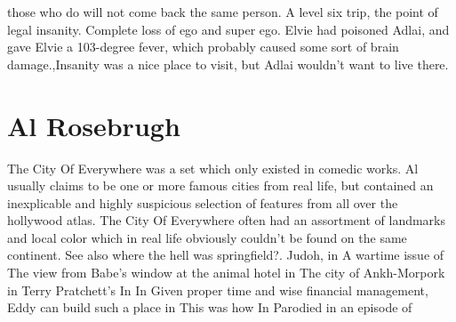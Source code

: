\documentclass[12pt]{book}
\begin{document}
those who do will not come back the same person. A level six trip, the point of legal insanity. Complete loss of ego and super ego. Elvie had poisoned Adlai, and gave Elvie a 103-degree fever, which probably caused some sort of brain damage.,Insanity was a nice place to visit, but Adlai wouldn't want to live there.



\chapter{Al Rosebrugh}

The City Of Everywhere was a set which only existed in comedic works. Al usually claims to be one or more famous cities from real life, but contained an inexplicable and highly suspicious selection of features from all over the hollywood atlas. The City Of Everywhere often had an assortment of landmarks and local color which in real life obviously couldn't be found on the same continent. See also where the hell was springfield?. Judoh, in A wartime issue of The view from Babe's window at the animal hotel in The city of Ankh-Morpork in Terry Pratchett's In In Given proper time and wise financial management, Eddy can build such a place in This was how In Parodied in an episode of
\end{document}
